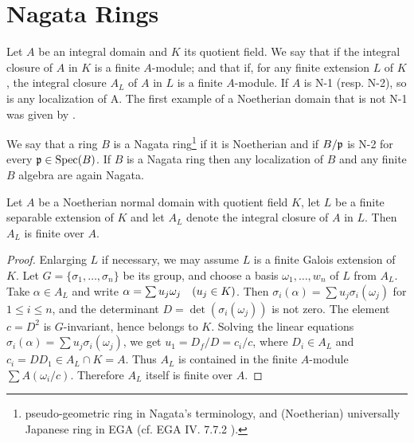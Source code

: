 \documentclass[../main]{subfiles}
\begin{document}
\section{Nagata Rings}\label{sec:31}

\begin{pardefinition}
 Let $A$ be an integral domain and $K$ its quotient field. We say that  if the integral closure of $A$ in $K$ is a finite $A$-module; and that  if, for any finite extension $L$ of $K$, the integral closure $A_L$ of $A$ in $L$ is a finite $A$-module. If $A$ is N-1 (resp. N-2), so is any localization of A. The first example of a Noetherian domain that is not N-1 was given by \cite{akizuji1935proceedings}.
\end{pardefinition}
We say that a ring $B$ is a Nagata ring\footnote{pseudo-geometric ring in Nagata's terminology, and (Noetherian) universally Japanese ring in EGA (cf. EGA IV. 7.7.2 \cite{egaIV2}).} if it is Noetherian and if $B / \mathfrak{p}$ is N-2 for every $\mathfrak{p} \in \operatorname{Spec}(B)$. If $B$ is a Nagata ring then any localization of $B$ and any finite $B$ algebra are again Nagata.

\begin{parproposition}\label{pro:31.01} Let $A$ be a Noetherian normal domain with quotient field $K$, let $L$ be a finite separable extension of $K$ and let $A_L$ denote the integral closure of $A$ in $L$. Then $A_L$ is finite over $A$.
\end{parproposition}
\begin{proof} Enlarging $L$ if necessary, we may assume $L$ is a finite Galois extension of $K$. Let $G=\{\sigma_1, \ldots, \sigma_n\}$ be its group, and choose a basis $\omega_1, \ldots, w_n$ of $L$ from $A_L$. Take $\alpha \in A_L$ and write $\alpha=\sum u_j \omega_j\for{u_j \in K}$. Then $\sigma_i(\alpha)=\sum u_j \sigma_i(\omega_j)$ for $1 \leq i \leq n$, and the determinant $D=\det(\sigma_i(\omega_j))$ is not zero. The element $c=D^2$ is $G$-invariant, hence belongs to $K$. Solving the linear equations\newline $\sigma_i(\alpha)=\sum u_j \sigma_i(\omega_j)$, we get $u_1=D_f / D =c_i / c$, where $D_i \in A_L$ and $c_i=DD_1 \in A_L \cap K=A$. Thus $A_L$ is contained in the finite $A$-module $\sum A(\omega_i / c)$. Therefore $A_L$ itself is finite over $A$.\end{proof}
\end{document}
